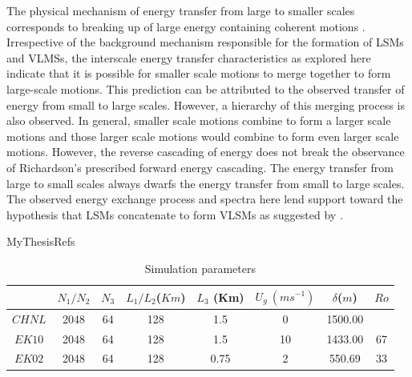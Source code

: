 The physical mechanism of energy transfer from large to smaller scales corresponds to breaking up of large energy containing coherent motions \citep[chap. 5]{davidson_turb_book}. Irrespective of the background mechanism responsible for the formation of LSMs and VLMSs, the interscale energy transfer characteristics as explored here indicate that it is possible for smaller scale motions to merge together to form large-scale motions. This prediction can be attributed to the observed transfer of energy from small to large scales. However, a hierarchy of this merging process is also observed. In general, smaller scale motions combine to form a larger scale motions and those larger scale motions would combine to form even larger scale motions. However, the reverse cascading of energy does not break the observance of Richardson's prescribed forward energy cascading. The energy transfer from large to small scales always dwarfs the energy transfer from small to large scales. The observed energy exchange process and spectra here lend support toward the hypothesis that LSMs concatenate to form VLSMs as suggested by \citet{kim_adrian_pof99, balakumar_adrian_ptrs_07, baltzer_jfm_13}.


 {MyThesisRefs}
\clearpage

\begin{table}
\centering
\footnotesize
\caption{Simulation parameters}
	\centering
	\begin{tabular}{ c c c c c c c c}
		\hline 
		       & $N_1/N_2$ & $N_3$ & $L_1/L_2$($Km$)  & $L_3$ (Km) & $U_g\ (ms^{-1})$ &$\delta$($m$)   & $Ro$ \\
		\hline  
		$CHNL$ & 2048      &  64   & 128              &  1.5       & 0                & 1500.00        &     \\
		$EK10$ & 2048      &  64   & 128              &  1.5       & 10               & 1433.00        & 67   \\
		$EK02$ & 2048      &  64   & 128              &  0.75      & 2                & 550.69         & 33  \\
		\hline 
		\hline 
	\end{tabular}
\label{tab:sim_param_chap2}
\end{table}

